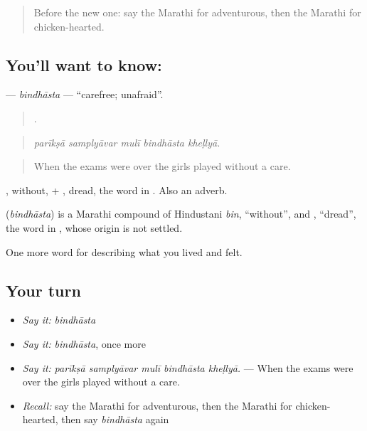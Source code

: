 \label{lesson:MR-C475-bindhasta}



\begin{quote}
Before the new one: say the Marathi for adventurous, then the Marathi for chicken-hearted.
\end{quote}

\subsection*{You'll want to know: }
\textbf{} — \emph{bindhāsta} — \textquotedblleft{}carefree; unafraid\textquotedblright{}.

\begin{quote}
    .
\end{quote}

\begin{quote}
\emph{parīkṣā samplyāvar mulī bindhāsta kheḷlyā.}
\end{quote}

\begin{quote}
When the exams were over the girls played without a care.
\end{quote}

, without, + , dread, the word in . Also an adverb.

\begin{cousinweb}
\textbf{} (\emph{bindhāsta}) is a Marathi compound of Hindustani \emph{bin}, \textquotedblleft{}without\textquotedblright{}, and , \textquotedblleft{}dread\textquotedblright{}, the word in , whose origin is not settled.
\end{cousinweb}

\begin{grammarlens}[title={What you've built}]
One more word for describing what you lived and felt.
\end{grammarlens}

\subsection*{Your turn}
\begin{itemize}
\raggedright
  \item \emph{Say it:} \emph{bindhāsta}
  \item \emph{Say it:} \emph{bindhāsta}, once more
  \item \emph{Say it:} \emph{parīkṣā samplyāvar mulī bindhāsta kheḷlyā.} — When the exams were over the girls played without a care.
  \item \emph{Recall:} say the Marathi for adventurous, then the Marathi for chicken-hearted, then say \emph{bindhāsta} again
\end{itemize}

